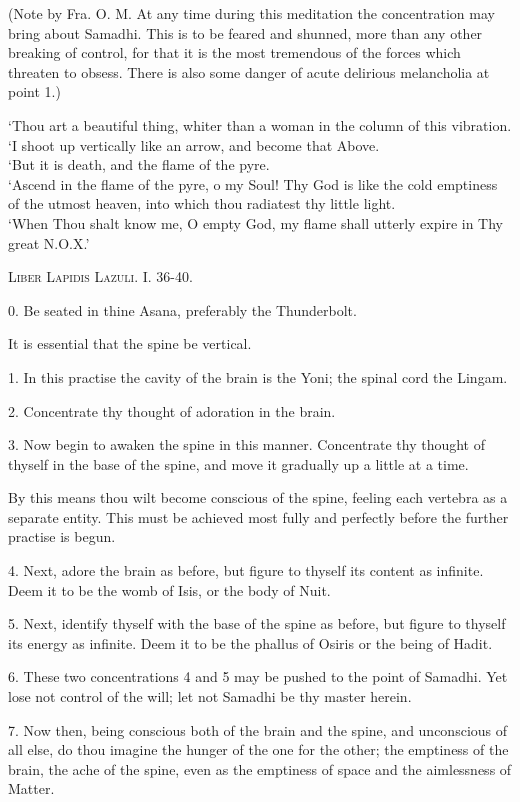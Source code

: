 (Note by Fra. O. M. At any time during this meditation the concentration may bring about Samadhi. This is to be feared and shunned, more than any other breaking of control, for that it is the most tremendous of the forces which threaten to obsess. There is also some danger of acute delirious melancholia at point 1.)


\pagebreak


\epigraph{
`Thou art a beautiful thing, whiter than a woman in the column of this vibration. \\
`I shoot up vertically like an arrow, and become that Above. \\
`But it is death, and the flame of the pyre. \\
`Ascend in the flame of the pyre, o my Soul! Thy God is like the cold emptiness of the utmost heaven, into which thou radiatest thy little light. \\
`When Thou shalt know me, O empty God, my flame shall utterly expire in Thy great N.O.X.' }{\textsc{Liber Lapidis Lazuli. I. 36-40.}}


0. Be seated in thine Asana, preferably the Thunderbolt.

It is essential that the spine be vertical.

1. In this practise the cavity of the brain is the Yoni; the spinal cord the Lingam.

2. Concentrate thy thought of adoration in the brain.

3. Now begin to awaken the spine in this manner. Concentrate thy thought of thyself in the base of the spine, and move it gradually up a little at a time.

By this means thou wilt become conscious of the spine, feeling each vertebra as a separate entity. This must be achieved most fully and perfectly before the further practise is begun.

4. Next, adore the brain as before, but figure to thyself its content as infinite. Deem it to be the womb of Isis, or the body of Nuit.

5. Next, identify thyself with the base of the spine as before, but figure to thyself its energy as infinite. Deem it to be the phallus of Osiris or the being of Hadit.

6. These two concentrations 4 and 5 may be pushed to the point of Samadhi. Yet lose not control of the will; let not Samadhi be thy master herein.

7. Now then, being conscious both of the brain and the spine, and unconscious of all else, do thou imagine the hunger of the one for the other; the emptiness of the brain, the ache of the spine, even as the emptiness of space and the aimlessness of Matter.

